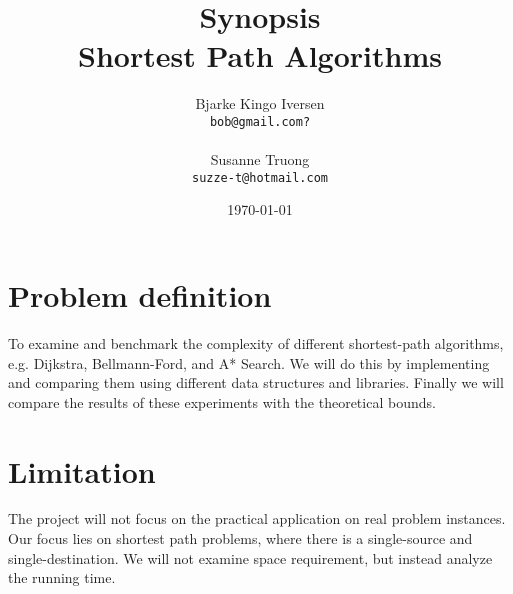\documentclass[11pt]{article}
\title{
  \vspace{3cm}
  \Huge{Synopsis} \\
  \Large{Shortest Path Algorithms}
}
\author{
  \Large{Bjarke Kingo Iversen}
  \\ \texttt{bob@gmail.com?} \\\\
  \Large{Susanne Truong}
  \\ \texttt{suzze-t@hotmail.com}
}
\date{
    \today
}
\def \ColourPDF {include/ku-farve}
\def \TitlePDF   {include/ku-en}  %
\begin{document}


\clearpage\maketitle
\thispagestyle{empty}

\newpage

\section{Problem definition}
To examine and benchmark the complexity of different shortest-path algorithms, e.g. Dijkstra, Bellmann-Ford, and A* Search. We will do this by implementing and comparing them using different data structures and libraries. Finally we will compare the results of these experiments with the theoretical bounds.
\section{Limitation}
The project will not focus on the practical application on real problem instances. Our focus lies on shortest path problems, where there is a single-source and single-destination. We will not examine space requirement, but instead analyze the running time.
\end{document}

